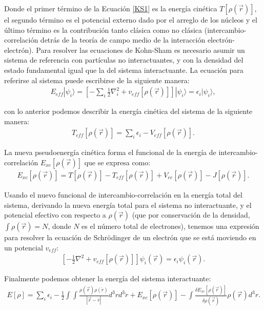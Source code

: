 Donde el primer término de la Ecuación \ref{KS1} es la energía cinética
$T[\rho(\vec{r})]$, el segundo término es el potencial externo dado por el
arreglo de los núcleos y el último término es la contribución tanto clásica
como no clásica (intercambio-correlación detrás de la teoría de campo medio de
la interacción electrón-electrón). Para resolver las ecuaciones de Kohn-Sham es
necesario asumir un sistema de referencia con partículas no interactuantes, y
con la densidad del estado fundamental igual que la del sistema interactuante.
La ecuación para referirse al sistema puede escribirse de la siguiente manera:
\begin{align}
  E_{eff}|\psi_{i}\rangle = \left [-\sum_{i}\frac12\nabla^{2}_{i} + v_{eff}[\rho(\vec{r})]\right ]|
  \psi_{i} \rangle = \epsilon_{i}|\psi_{i}\rangle ,
\end{align}

\noindent con lo anterior podemos describir la energía cinética del sistema de
la siguiente manera:
\begin{align}
  T_{eff}[\rho(\vec{r})] = \sum_{i}\epsilon_{i} - V_{eff}[\rho(\vec{r})].
\end{align}

La nueva pseudoenergía cinética forma el funcional de la energía de
intercambio-correlación $E_{xc}[\rho(\vec{r})]$ que se expresa como:
\begin{align}
  E_{xc}[\rho(\vec{r})] = T[\rho(\vec{r})] - T_{eff}[\rho(\vec{r})] +
  V_{ee}[\rho(\vec{r})] - J[\rho(\vec{r})] .
\end{align}

Usando el nuevo funcional de intercambio-correlación en la energía total del
sistema, derivando la nueva energía total para el sistema no interactuante, y
el potencial efectivo con respecto a $\rho(\vec{r})$ (que por conservación de
la densidad, $\int\rho(\vec{r})=N$, donde $N$ es el número total de
electrones), tenemos una expresión para resolver la ecuación de Schr\"odinger
de un electrón que se está moviendo en un potencial $v_{eff}$:
\begin{align}
  \left[-\frac12\nabla^2 + v_{eff}[\rho(\vec{r})]\right]\psi_{i}(\vec{r})=\epsilon_{i}\psi_{i}(\vec{r}).
\end{align}

Finalmente podemos obtener la energía del sistema interactuante:
\begin{align}
  E[\rho] = \sum_i\epsilon_i -\frac12\int\int\frac{\rho(\vec{r})\rho(\acute{r})}
  {|\vec{r}-\acute{r}|}d^3r d^3\acute{r}+ E_{xc}[\rho(\vec{r})] -
  \int\frac{\delta E_{xc}[\rho(\vec{r})]}{\delta\rho(\vec{r})}\rho(\vec{r})d^3r .
\end{align}

